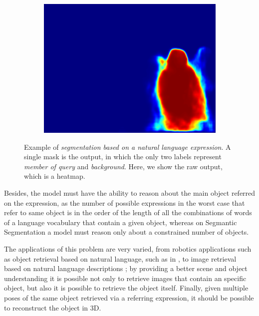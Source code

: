 \begin{figure}
\begin{subfigure}[b]{0.33\columnwidth}
            \centering
            \includegraphics[width=\textwidth]{./figures/Mask_2.png}
    \label{fig:fig1}
    \end{subfigure}
    \caption{\label{fig:query} Example of \textit{segmentation based on a natural language expression}. A single mask is the output, in which the only two labels represent \textit{member of query} and \textit{background}. Here, we show the raw output, which is a heatmap.}
\end{figure}

Besides, the model must have the ability to reason about the main object referred on the expression, as the number of possible expressions in the worst case that refer to same object is in the order of the length of all the combinations of words of a language vocabulary that contain a given object, whereas on Segmantic Segmentation a model must reason only about a constrained number of objects.

The applications of this problem are very varied, from robotics applications such as object retrieval based on natural language, such as in \cite{guadarrama_understanding_2016}, to image retrieval based on natural language descriptions \cite{schuster2015generating}; by providing a better scene and object understanding it is possible not only to retrieve images that contain an specific object, but also it is possible to retrieve the object itself. Finally, given multiple poses of the same object retrieved via a referring expression, it should be possible to reconstruct the object in 3D.


